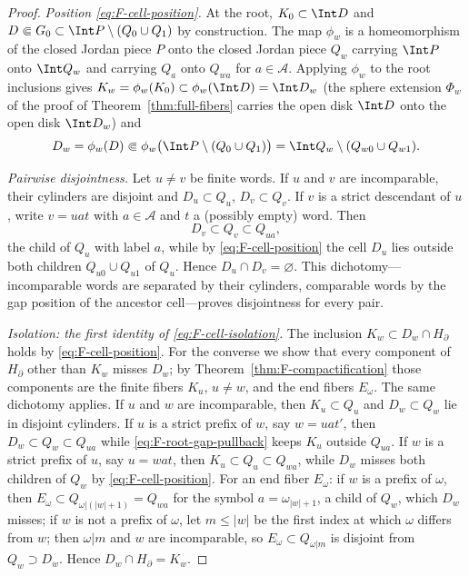 \begin{proof}
\emph{Position \eqref{eq:F-cell-position}.}
At the root, $K_0\subset\Int D$ and
$D\Subset G_0\subset\Int P\setminus(Q_0\cup Q_1)$ by construction.  The
map $\phi_w$ is a homeomorphism of the closed Jordan piece $P$ onto the
closed Jordan piece $Q_w$ carrying $\Int P$ onto $\Int Q_w$ and carrying
$Q_a$ onto $Q_{wa}$ for $a\in\mathcal A$.  Applying $\phi_w$ to the root
inclusions gives
$K_w=\phi_w(K_0)\subset\phi_w(\Int D)=\Int D_w$ (the sphere extension
$\Phi_w$ of the proof of Theorem~\ref{thm:full-fibers} carries the open
disk $\Int D$ onto the open disk $\Int D_w$) and
\[
D_w=\phi_w(D)
\Subset\phi_w\bigl(\Int P\setminus(Q_0\cup Q_1)\bigr)
=\Int Q_w\setminus(Q_{w0}\cup Q_{w1}).
\]

\emph{Pairwise disjointness.}
Let $u\ne v$ be finite words.  If $u$ and $v$ are incomparable, their
cylinders are disjoint and $D_u\subset Q_u$, $D_v\subset Q_v$.  If $v$ is
a strict descendant of $u$, write $v=uat$ with $a\in\mathcal A$ and $t$ a
(possibly empty) word.  Then
\[
D_v\subset Q_v\subset Q_{ua},
\]
the child of $Q_u$ with label $a$, while by
\eqref{eq:F-cell-position} the cell $D_u$ lies outside both children
$Q_{u0}\cup Q_{u1}$ of $Q_u$.  Hence $D_u\cap D_v=\varnothing$.  This
dichotomy---incomparable words are separated by their cylinders,
comparable words by the gap position of the ancestor cell---proves
disjointness for every pair.

\emph{Isolation: the first identity of \eqref{eq:F-cell-isolation}.}
The inclusion $K_w\subset D_w\cap H_\partial$ holds by
\eqref{eq:F-cell-position}.  For the converse we show that every
component of $H_\partial$ other than $K_w$ misses $D_w$; by
Theorem~\ref{thm:F-compactification} those components are the finite
fibers $K_u$, $u\ne w$, and the end fibers $E_\omega$.  The same
dichotomy applies.  If $u$ and $w$ are incomparable, then
$K_u\subset Q_u$ and $D_w\subset Q_w$ lie in disjoint cylinders.  If $u$
is a strict prefix of $w$, say $w=uat'$, then $D_w\subset Q_w\subset
Q_{ua}$ while \eqref{eq:F-root-gap-pullback} keeps $K_u$ outside
$Q_{ua}$.  If $w$ is a strict prefix of $u$, say $u=wat$, then
$K_u\subset Q_u\subset Q_{wa}$, while $D_w$ misses both children of
$Q_w$ by \eqref{eq:F-cell-position}.  For an end fiber $E_\omega$: if $w$
is a prefix of $\omega$, then
$E_\omega\subset Q_{\omega|(|w|+1)}=Q_{wa}$ for the symbol
$a=\omega_{|w|+1}$, a child of $Q_w$, which $D_w$ misses; if $w$ is not a
prefix of $\omega$, let $m\le|w|$ be the first index at which $\omega$
differs from $w$; then $\omega|m$ and $w$ are incomparable, so
$E_\omega\subset Q_{\omega|m}$ is disjoint from $Q_w\supset D_w$.  Hence
$D_w\cap H_\partial=K_w$.


\end{proof}
